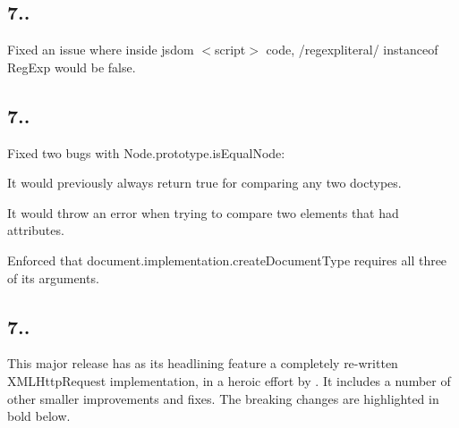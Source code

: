 \subsection*{7..}


\begin{DoxyItemize}
\item Fixed an issue where inside jsdom {\ttfamily $<$script$>$} code, {\ttfamily /regexpliteral/ instanceof Reg\+Exp} would be {\ttfamily false}.
\end{DoxyItemize}

\subsection*{7..}


\begin{DoxyItemize}
\item Fixed two bugs with {\ttfamily Node.\+prototype.\+is\+Equal\+Node}\+:
\begin{DoxyItemize}
\item It would previously always return {\ttfamily true} for comparing any two doctypes.
\item It would throw an error when trying to compare two elements that had attributes.
\end{DoxyItemize}
\item Enforced that {\ttfamily document.\+implementation.\+create\+Document\+Type} requires all three of its arguments.
\end{DoxyItemize}

\subsection*{7..}

This major release has as its headlining feature a completely re-\/written {\ttfamily X\+M\+L\+Http\+Request} implementation, in a heroic effort by \href{https://github.com/nicolashenry}{\tt }. It includes a number of other smaller improvements and fixes. The breaking changes are highlighted in bold below.


